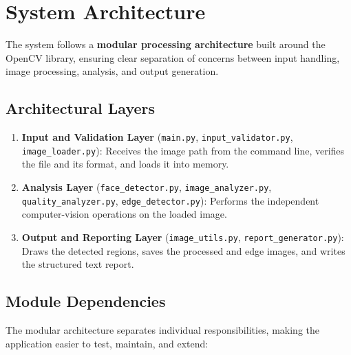 \documentclass[11pt,a4paper]{article}
\begin{document}
\section{System Architecture}
The system follows a \textbf{modular processing architecture} built around the OpenCV library, ensuring clear separation of concerns between input handling, image processing, analysis, and output generation.

\subsection{Architectural Layers}
\begin{enumerate}[leftmargin=1.5em]
    \item \textbf{Input and Validation Layer} (\texttt{main.py}, \texttt{input\_validator.py}, \texttt{image\_loader.py}): Receives the image path from the command line, verifies the file and its format, and loads it into memory.
    \item \textbf{Analysis Layer} (\texttt{face\_detector.py}, \texttt{image\_analyzer.py}, \texttt{quality\_analyzer.py}, \texttt{edge\_detector.py}): Performs the independent computer-vision operations on the loaded image.
    \item \textbf{Output and Reporting Layer} (\texttt{image\_utils.py}, \texttt{report\_generator.py}): Draws the detected regions, saves the processed and edge images, and writes the structured text report.
\end{enumerate}

\subsection{Module Dependencies}
The modular architecture separates individual responsibilities, making the application easier to test, maintain, and extend:
\end{document}
